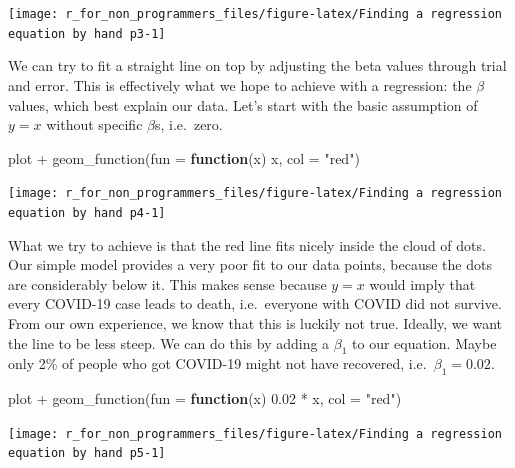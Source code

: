 \documentclass[
]{book}
\newenvironment{Shaded}{\begin{snugshade}}{\end{snugshade}}
\newcommand{\AttributeTok}[1]{\textcolor[rgb]{0.77,0.63,0.00}{#1}}
\newcommand{\ControlFlowTok}[1]{\textcolor[rgb]{0.13,0.29,0.53}{\textbf{#1}}}
\newcommand{\FloatTok}[1]{\textcolor[rgb]{0.00,0.00,0.81}{#1}}
\newcommand{\FunctionTok}[1]{\textcolor[rgb]{0.00,0.00,0.00}{#1}}
\newcommand{\NormalTok}[1]{#1}
\newcommand{\SpecialCharTok}[1]{\textcolor[rgb]{0.00,0.00,0.00}{#1}}
\newcommand{\StringTok}[1]{\textcolor[rgb]{0.31,0.60,0.02}{#1}}
\begin{document}
\begin{center}\texttt{[image: r\_for\_non\_programmers\_files/figure-latex/Finding a regression equation by hand p3-1]} \end{center}

We can try to fit a straight line on top by adjusting the beta values through trial and error. This is effectively what we hope to achieve with a regression: the \(\beta\) values, which best explain our data. Let's start with the basic assumption of \(y = x\) without specific \(\beta\)s, i.e.~zero.

\begin{Shaded}
\begin{Highlighting}[]
\NormalTok{plot }\SpecialCharTok{+}
  \FunctionTok{geom\_function}\NormalTok{(}\AttributeTok{fun =} \ControlFlowTok{function}\NormalTok{(x) x, }\AttributeTok{col =} \StringTok{"red"}\NormalTok{)}
\end{Highlighting}
\end{Shaded}

\begin{center}\texttt{[image: r\_for\_non\_programmers\_files/figure-latex/Finding a regression equation by hand p4-1]} \end{center}

What we try to achieve is that the red line fits nicely inside the cloud of dots. Our simple model provides a very poor fit to our data points, because the dots are considerably below it. This makes sense because \(y = x\) would imply that every COVID-19 case leads to death, i.e.~everyone with COVID did not survive. From our own experience, we know that this is luckily not true. Ideally, we want the line to be less steep. We can do this by adding a \(\beta_1\) to our equation. Maybe only 2\% of people who got COVID-19 might not have recovered, i.e.~\(\beta_1 = 0.02\).

\begin{Shaded}
\begin{Highlighting}[]
\NormalTok{plot }\SpecialCharTok{+}
  \FunctionTok{geom\_function}\NormalTok{(}\AttributeTok{fun =} \ControlFlowTok{function}\NormalTok{(x) }\FloatTok{0.02} \SpecialCharTok{*}\NormalTok{ x, }\AttributeTok{col =} \StringTok{"red"}\NormalTok{)}
\end{Highlighting}
\end{Shaded}

\begin{center}\texttt{[image: r\_for\_non\_programmers\_files/figure-latex/Finding a regression equation by hand p5-1]} \end{center}
\end{document}
